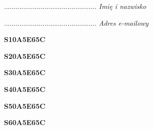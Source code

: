 \begin{turn}{90}\begin{minipage}{\linewidth} \vspace{20mm} ................................................  \textit{Imię i nazwisko}\end{minipage}\end{turn}

\begin{turn}{90}\begin{minipage}{\linewidth} \vspace{20mm} ................................................  \textit{Adres e-mailowy}\end{minipage}\end{turn}

\begin{turn}{90}\huge \begin{minipage}{\linewidth} \vspace{10mm}\textbf{S10A5E65C}\end{minipage}\end{turn}

\begin{turn}{90}\huge \begin{minipage}{\linewidth} \vspace{10mm}\textbf{S20A5E65C}\end{minipage}\end{turn}

\begin{turn}{90}\huge \begin{minipage}{\linewidth} \vspace{10mm}\textbf{S30A5E65C}\end{minipage}\end{turn}

\begin{turn}{90}\huge \begin{minipage}{\linewidth} \vspace{10mm}\textbf{S40A5E65C}\end{minipage}\end{turn}

\begin{turn}{90}\huge \begin{minipage}{\linewidth} \vspace{10mm}\textbf{S50A5E65C}\end{minipage}\end{turn}

\begin{turn}{90}\huge \begin{minipage}{\linewidth} \vspace{10mm}\textbf{S60A5E65C}\end{minipage}\end{turn}

